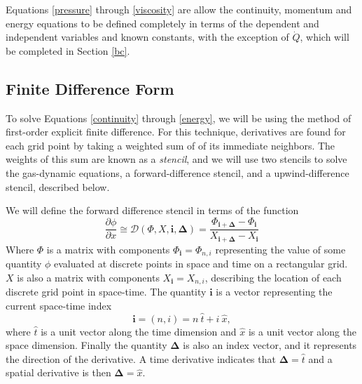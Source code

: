 \documentclass[iop]{emulateapj}
\begin{document}
				Equations \ref{pressure} through \ref{viscosity} are allow the continuity, momentum and energy equations to be defined completely in terms of the dependent and independent variables and known constants, with the exception of $\dot{Q}$, which will be completed in Section \ref{bc}.
				
			\subsection{Finite Difference Form}
			
				To solve Equations \ref{continuity} through \ref{energy}, we will be using the method of first-order explicit finite difference. For this technique, derivatives are found for each grid point by taking a weighted sum of of its immediate neighbors. The weights of this sum are known as a \textit{stencil}, and we will use two stencils to solve the gas-dynamic equations, a forward-difference stencil, and a upwind-difference stencil, described below.
				
				We will define the forward difference stencil in terms of the function
				\begin{equation}
					\frac{\partial \phi}{\partial x} \cong \mathcal{D}(\Phi, X, \mathbf{i},\mathbf{\Delta}) = \frac{\Phi_{\mathbf{i} + \mathbf{\Delta}} - \Phi_{\mathbf{i}}}{X_{\mathbf{i} + \mathbf{\Delta}} - X_{\mathbf{i}}}
				\end{equation}
				Where $\Phi$ is a matrix with components $\Phi_\mathbf{i} = \Phi_{n,i}$ representing the value of some quantity $\phi$ evaluated at discrete points in space and time on a rectangular grid. $X$ is also a matrix with components $X_\mathbf{i} = X_{n,i}$, describing the location of each discrete grid point in space-time. The quantity $\mathbf{i}$ is a vector representing the current space-time index
				\begin{equation}
					\mathbf{i} = (n,i) = n \ \hat{t} + i \ \hat{x},
				\end{equation}
				where $\hat{t}$ is a unit vector along the time dimension and $\hat{x}$ is a unit vector along the space dimension. Finally the quantity $\mathbf{\Delta}$ is also an index vector, and it represents the direction of the derivative. A time derivative indicates that $\mathbf{\Delta} = \hat{t}$ and a spatial derivative is then $\mathbf{\Delta} = \hat{x}$.
				
\end{document}
